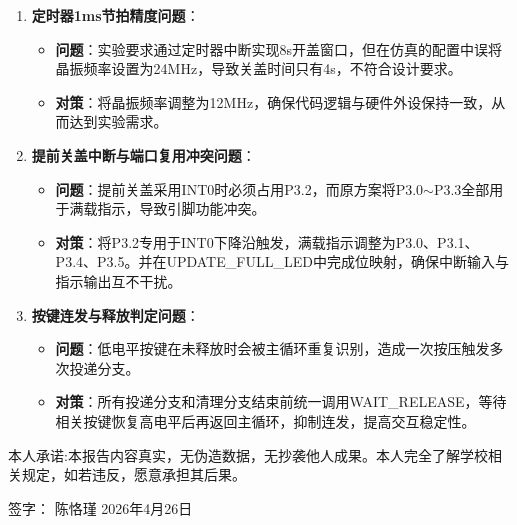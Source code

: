 \documentclass[12pt,a4paper]{article}
\begin{document}
\begin{enumerate}
    \item \textbf{定时器1ms节拍精度问题}：
    \begin{itemize}
        \item \textbf{问题}：实验要求通过定时器中断实现8s开盖窗口，但在仿真的配置中误将晶振频率设置为24MHz，导致关盖时间只有4s，不符合设计要求。
        \item \textbf{对策}：将晶振频率调整为12MHz，确保代码逻辑与硬件外设保持一致，从而达到实验需求。
    \end{itemize}
    
    \item \textbf{提前关盖中断与端口复用冲突问题}：
    \begin{itemize}
        \item \textbf{问题}：提前关盖采用INT0时必须占用P3.2，而原方案将P3.0$\sim$P3.3全部用于满载指示，导致引脚功能冲突。
        \item \textbf{对策}：将P3.2专用于INT0下降沿触发，满载指示调整为P3.0、P3.1、P3.4、P3.5。并在UPDATE\_FULL\_LED中完成位映射，确保中断输入与指示输出互不干扰。
    \end{itemize}

    \item \textbf{按键连发与释放判定问题}：
    \begin{itemize}
        \item \textbf{问题}：低电平按键在未释放时会被主循环重复识别，造成一次按压触发多次投递分支。
        \item \textbf{对策}：所有投递分支和清理分支结束前统一调用WAIT\_RELEASE，等待相关按键恢复高电平后再返回主循环，抑制连发，提高交互稳定性。
    \end{itemize}

\end{enumerate}

\vspace{2cm}
\noindent
本人承诺:本报告内容真实，无伪造数据，无抄袭他人成果。本人完全了解学校相关规定，如若违反，愿意承担其后果。

\vspace{1cm}
\noindent
签字：\hspace{3cm} 陈恪瑾 \hspace{3cm} 2026年4月26日
\end{document}
